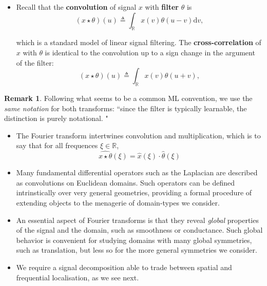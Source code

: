 \documentclass[12pt]{article}
\numberwithin{equation}{section}
\theoremstyle{definition}
\newtheorem{rmk}[thm]{Remark}
\newcommand{		\n		}	{	\noindent					} %
\newcommand{		\1		}	{	\bm{1}					}%
\begin{document}
\begin{itemize}


    
\item Recall that the \textbf{convolution} of signal $x$ with \textbf{filter} $\theta$ is
    $$
    (x \star \theta) (u ) \triangleq \int_{\mathbb{R}} x(v) \theta(u -v ) \textrm{d} v ,
    $$
    
    which is a standard model of linear signal filtering. The \textbf{cross-correlation} of $x$ with $\theta$ is identical to the convolution up to a sign change in the argument of the filter:
    $$
    (x \star \theta) (u) \triangleq \int_{\mathbb{R}} x(v) \theta (u + v),
    $$
\end{itemize}

\n\hrulefill
\begin{rmk}
Following what seems to be a common ML convention, we use the \emph{same notation} for both transforms: ``since the filter is typically learnable, the distinction is purely notational. "
\end{rmk}
\n\hrulefill

\begin{itemize}
    
\item The Fourier transform intertwines convolution and multiplication, which is to say that for all frequences $\xi \in \mathbb{R}$,
    $$
    \widehat{x \star \theta} (\xi) = \hat{x} (\xi) \cdot \hat{\theta}(\xi)
    $$
    
\item Many fundamental differential operators such as the Laplacian are described as convolutions on Euclidean domains. Such operators can be defined intrinstically over very general geometries, providing a formal procedure of extending objects to the menagerie of domain-types we consider.

\item An essential aspect of Fourier transforms is that they reveal \emph{global} properties of the signal and the domain, such as smoothness or conductance. Such global behavior is convenient for studying domains with many global symmetries, such as translation, but less so for the more general symmetries we consider. 

\item We require a signal decomposition able to trade between spatial and frequential localisation, as we see next.

\end{itemize}
\end{document}
